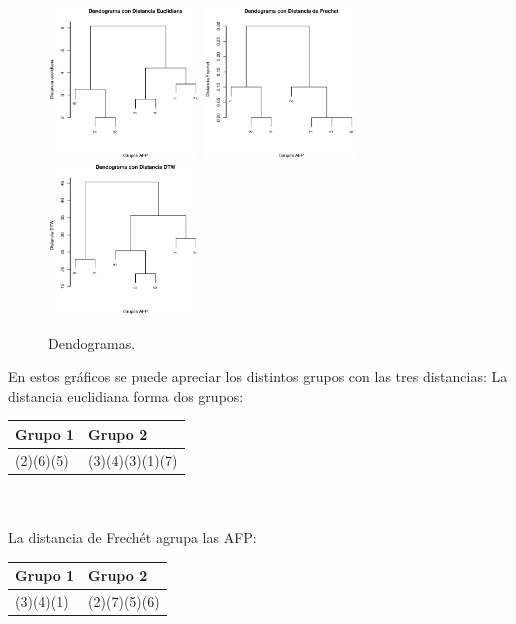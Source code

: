 \begin{figure}[!htp]
\begin{center}
\centering
  \includegraphics[height=4cm, width=4cm]{den_dist_euc.eps}
  \includegraphics[height=4cm, width=4cm]{den_dist_dfr.eps}
  \includegraphics[height=4cm, width=4cm]{den_dist_dtw.eps}
   \caption{Dendogramas.}
\label{caja}
\end{center}
\end{figure}

En estos gr\'aficos se puede apreciar los distintos grupos con las tres distancias:
La distancia euclidiana forma dos grupos:

\begin{tabular}{|l|l|}
\hline
Grupo 1 & Grupo 2 \\
\hline
(2)(6)(5) & (3)(4)(3)(1)(7) \\
\hline
\end{tabular}
\\
\\
La distancia de Frech\'et agrupa las AFP:

\begin{tabular}{|l|l|}
\hline
Grupo 1 & Grupo 2 \\
\hline
(3)(4)(1) & (2)(7)(5)(6) \\
\hline
\end{tabular}

